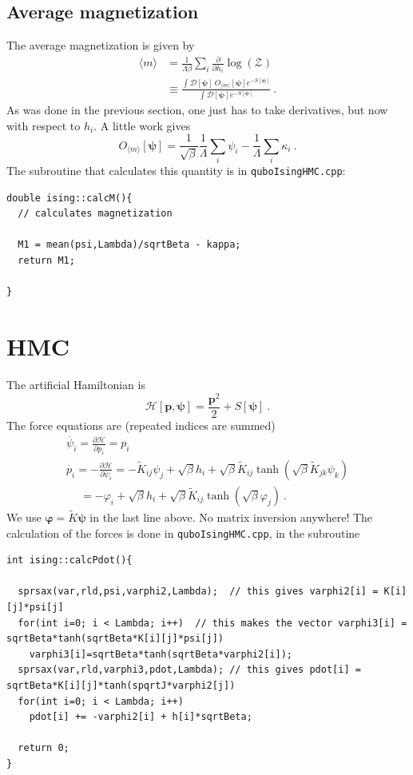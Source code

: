 \documentclass[11pt]{article}
\begin{document}
\subsection{Average magnetization}
The average magnetization is given by
\begin{align}
\langle m\rangle&=\frac{1}{\Lambda \beta}\sum_i \frac{\partial}{\partial h_i} \log (\mathcal{Z})\\
&\equiv\frac{\int\mathcal{D}[\bm\psi]\ O_{\langle m\rangle}[\bm\psi]e^{-S[\bm\psi]}}{\int\mathcal{D}[\bm\psi]e^{-S[\bm\psi]}}\ .
\end{align}
As was done in the previous section, one just has to take derivatives, but now with respect to $h_i$.  A little work gives
\begin{equation}\label{eqn:m op}
O_{\langle m\rangle}[\bm\psi]=\frac{1}{\sqrt{\beta}}\frac{1}{\Lambda}\sum_i\psi_i -\frac{1}{\Lambda}\sum_i\kappa_i\ .
\end{equation}
The subroutine that calculates this quantity is in \texttt{quboIsingHMC.cpp}:
\begin{lstlisting}
double ising::calcM(){
  // calculates magnetization

  M1 = mean(psi,Lambda)/sqrtBeta - kappa;
  return M1;

}
\end{lstlisting}

\section{HMC}
The artificial Hamiltonian is
\begin{equation}
\mathcal{H}[\bm p,\bm \psi]=\frac{\bm p^2}{2}+S[\bm \psi]\ .
\end{equation}
The force equations are (repeated indices are summed)
\begin{equation}
\begin{array}{l}
{\dot{\psi_i}=\frac{\partial \mathcal{H}}{\partial p_i}=p_i} \\
{\dot{p_i}=-\frac{\partial \mathcal{H}}{\partial\psi_i}=-\tilde{K}_{ij} \psi_j+\sqrt{\beta}h_i+\sqrt{\beta} \tilde{K}_{ij} \tanh (\sqrt{\beta} \tilde{K}_{jk} \psi_k)}\\
{\quad\ =-\varphi_i+\sqrt{\beta}h_i+\sqrt{\beta} \tilde{K}_{ij} \tanh (\sqrt{\beta} \varphi_j)}\ .
\end{array}
\end{equation}
We use $\bm \varphi=\tilde K\bm \psi$ in the last line above. No matrix inversion anywhere!   The calculation of the forces is done in \texttt{quboIsingHMC.cpp}, in the subroutine
{\tiny
\begin{lstlisting}
int ising::calcPdot(){

  sprsax(var,rld,psi,varphi2,Lambda);  // this gives varphi2[i] = K[i][j]*psi[j]
  for(int i=0; i < Lambda; i++)  // this makes the vector varphi3[i] = sqrtBeta*tanh(sqrtBeta*K[i][j]*psi[j])
    varphi3[i]=sqrtBeta*tanh(sqrtBeta*varphi2[i]);
  sprsax(var,rld,varphi3,pdot,Lambda); // this gives pdot[i] = sqrtBeta*K[i][j]*tanh(spqrtJ*varphi2[j])
  for(int i=0; i < Lambda; i++)
    pdot[i] += -varphi2[i] + h[i]*sqrtBeta;

  return 0;
}
\end{lstlisting}
}
\end{document}
